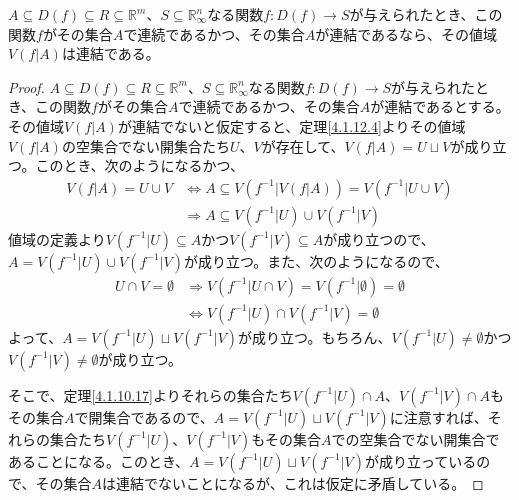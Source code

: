 \documentclass[dvipdfmx]{jsarticle}
\begin{document}
\begin{thm}\label{4.1.12.5}
$A \subseteq D(f) \subseteq R \subseteq \mathbb{R}^{m}$、$S \subseteq \mathbb{R}_{\infty}^{n}$なる関数$f:D(f) \rightarrow S$が与えられたとき、この関数$f$がその集合$A$で連続であるかつ、その集合$A$が連結であるなら、その値域$V\left( f|A \right)$は連結である。
\end{thm}
\begin{proof}
$A \subseteq D(f) \subseteq R \subseteq \mathbb{R}^{m}$、$S \subseteq \mathbb{R}_{\infty}^{n}$なる関数$f:D(f) \rightarrow S$が与えられたとき、この関数$f$がその集合$A$で連続であるかつ、その集合$A$が連結であるとする。その値域$V\left( f|A \right)$が連結でないと仮定すると、定理\ref{4.1.12.4}よりその値域$V\left( f|A \right)$の空集合でない開集合たち$U$、$V$が存在して、$V\left( f|A \right) = U \sqcup V$が成り立つ。このとき、次のようになるかつ、
\begin{align*}
V\left( f|A \right) = U \cup V &\Leftrightarrow A \subseteq V\left( f^{- 1}|V\left( f|A \right) \right) = V\left( f^{- 1}|U \cup V \right)\\
&\Rightarrow A \subseteq V\left( f^{- 1}|U \right) \cup V\left( f^{- 1}|V \right)
\end{align*}
値域の定義より$V\left( f^{- 1}|U \right) \subseteq A$かつ$V\left( f^{- 1}|V \right) \subseteq A$が成り立つので、$A = V\left( f^{- 1}|U \right) \cup V\left( f^{- 1}|V \right)$が成り立つ。また、次のようになるので、
\begin{align*}
U \cap V = \emptyset &\Rightarrow V\left( f^{- 1}|U \cap V \right) = V\left( f^{- 1}|\emptyset \right) = \emptyset\\
&\Leftrightarrow V\left( f^{- 1}|U \right) \cap V\left( f^{- 1}|V \right) = \emptyset
\end{align*}
よって、$A = V\left( f^{- 1}|U \right) \sqcup V\left( f^{- 1}|V \right)$が成り立つ。もちろん、$V\left( f^{- 1}|U \right) \neq \emptyset$かつ$V\left( f^{- 1}|V \right) \neq \emptyset$が成り立つ。\par
そこで、定理\ref{4.1.10.17}よりそれらの集合たち$V\left( f^{- 1}|U \right) \cap A$、$V\left( f^{- 1}|V \right) \cap A$もその集合$A$で開集合であるので、$A = V\left( f^{- 1}|U \right) \sqcup V\left( f^{- 1}|V \right)$に注意すれば、それらの集合たち$V\left( f^{- 1}|U \right)$、$V\left( f^{- 1}|V \right)$もその集合$A$での空集合でない開集合であることになる。このとき、$A = V\left( f^{- 1}|U \right) \sqcup V\left( f^{- 1}|V \right)$が成り立っているので、その集合$A$は連結でないことになるが、これは仮定に矛盾している。
\end{proof}
\end{document}
